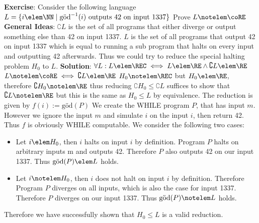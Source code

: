 \documentclass[10pt,a4paper,english]{article}
\begin{document}
    \textbf{Exercise}:\newline
    Consider the following language $L = \{ i \elem \NN \mid \text{göd}^{-1}(i) \text{ outputs 42 on input 1337} \}$\newline
    Prove $L \notelem \coRE$\newline\newline
    \textbf{General Ideas}:\newline
    $\complement{L}$ is the set of all programs that either diverge or output something else than 42 on input 1337.\newline
    $L$ is the set of all programs that output 42 on input 1337 which is equal to running a sub program that halts on every input and outputting 42 afterwards.
    Thus we could try to reduce the special halting problem $H_0$ to $L$.\newline\newline
    \textbf{Solution}:\newline
    $\forall L: L \elem \REC \iff L \elem \RE \wedge \complement{L} \elem \RE$\newline
    $L \notelem \coRE \iff \complement{L} \elem \RE$\newline\newline
    $H_0 \notelem \REC$ but $H_0 \elem \RE$, therefore $\complement{H_0} \notelem \RE$ thus reducing $\complement{H_0} \leq \complement{L}$ suffices to show that
    $\complement{L} \notelem \RE$ but this is the same as $H_0 \leq L$ by equivalence.\newline\newline
    The reduction is given by $f(i) := \text{göd}(P)$\newline
    We create the WHILE program $P$, that has input $m$. However we ignore the input $m$ and simulate $i$ on the input $i$, then return 42.
    Thus $f$ is obviously WHILE computable.\newline\newline
    We consider the following two cases:
    \begin{itemize}
        \item Let $i \elem H_0$, then $i$ halts on input $i$ by definition. Program $P$ halts on arbitrary inputs m and outputs 42.
        Therefore $P$ also outputs 42 on our input 1337.\newline
        Thus $\text{göd}(P) \elem L$ holds.
        \item Let $i \notelem H_0$, then $i$ does not halt on input $i$ by definition. Therefore Program $P$ diverges on all inputs, which is also the case for input 1337.\newline
        Therefore $P$ diverges on our input 1337.\newline
        Thus $\text{göd}(P) \notelem L$ holds.
    \end{itemize}
    Therefore we have successfully shown that $H_0 \leq L$ is a valid reduction.
\end{document}
